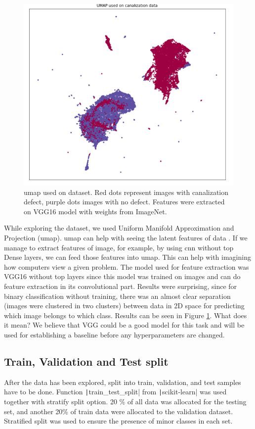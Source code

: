 \documentclass[thesis=B,english]{FITthesis}[2019/12/23]
\begin{document}
\begin{figure}
    \centering
    \includegraphics[width=\textwidth]{umap.PNG}
    \caption[\gls{umap}]{\gls{umap} used on dataset. Red dots represent images with canalization defect, purple dots images with no defect. Features were extracted on VGG16 model with weights from ImageNet.}
    \label{fig:umap}
\end{figure}

While exploring the dataset, we used Uniform Manifold Approximation and Projection (\gls{umap}). \gls{umap} can help with seeing the latent features of data \cite{lel2018umap}. If we manage to extract features of image, for example, by using \gls{cnn} without top Dense layers, we can feed those features into \gls{umap}. This can help with imagining how computers view a given problem. The model used for feature extraction was VGG16 without top layers since this model was trained on images and can do feature extraction in its convolutional part. Results were surprising, since for binary classification without training, there was an almost clear separation (images were clustered in two clusters) between data in 2D space for predicting which image belongs to which class. Results can be seen in Figure \ref{fig:umap}. What does it mean? We believe that VGG could be a good model for this task and will be used for establishing a baseline before any hyperparameters are changed.


\subsection{Train, Validation and Test split}
After the data has been explored, split into train, validation, and test samples have to be done. Function \texttt|train_test_split| from \texttt|scikit-learn| was used together with stratify split option. 20 \% of all data was allocated for the testing set, and another 20\% of train data were allocated to the validation dataset. Stratified split was used to ensure the presence of minor classes in each set. 
\end{document}
